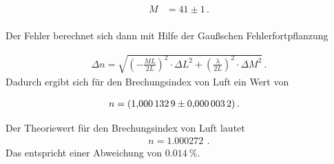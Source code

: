 \begin{align*}
  M &= 41 \pm 1 \, .\\
\end{align*}

Der Fehler berechnet sich dann mit Hilfe der Gaußschen Fehlerfortpflanzung

\begin{align*}
  \Delta{n} = \sqrt{\left( -\frac{M L}{2L} \right)^2 \cdot \Delta{L}^2
  + \left(\frac{\lambda}{2 L} \right)^2 \cdot \Delta{M}^2} \, .
\end{align*}
Dadurch ergibt sich für den Brechungsindex von Luft ein Wert von

\begin{align*}
n &= \SI{1.0001329 \pm 0.0000032}{} \, .
\end{align*}

Der Theoriewert für den Brechungsindex von Luft lautet
\begin{align*}
  n = \SI{1.000272}{} \, .
\end{align*}
Das entspricht einer Abweichung von $\SI{0.014}{\%}$.
